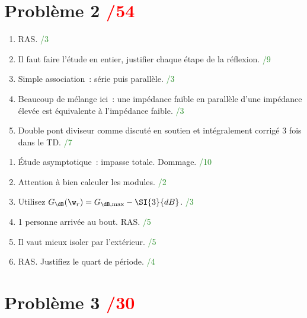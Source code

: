 \documentclass[a4paper, 10pt, final, garamond]{book}
\begin{document}
\section{Problème 2 \hfill \textcolor{red}{/54}}

\begin{minipage}{0.48\linewidth}
    \begin{enumerate}
        \item RAS. \hfill \textcolor{ForestGreen}{/3}
        \item Il faut faire l'étude en entier, justifier chaque étape de la
            réflexion. \hfill \textcolor{ForestGreen}{/9}
        \item Simple association~: série puis parallèle. \hfill
            \textcolor{ForestGreen}{/3}
        \item Beaucoup de mélange ici~: une impédance faible en parallèle d'une
            impédance élevée est équivalente à l'impédance faible. \hfill
            \textcolor{ForestGreen}{/3}
        \item Double pont diviseur comme discuté en soutien et intégralement corrigé
            3 fois dans le TD. \hfill \textcolor{ForestGreen}{/7}
    \end{enumerate}
\end{minipage}
\hfill
\begin{minipage}{0.48\linewidth}
    \begin{enumerate}
        \item Étude asymptotique~: impasse totale. Dommage. \hfill
            \textcolor{ForestGreen}{/10}
        \item Attention à bien calculer les modules. \hfill
            \textcolor{ForestGreen}{/2}
        \item Utilisez $G_{\dB}(\w_r) = G_{\dB, \max} - \SI{3}{dB}$. \hfill
            \textcolor{ForestGreen}{/3}
        \item 1 personne arrivée au bout. RAS. \hfill \textcolor{ForestGreen}{/5}
        \item Il vaut mieux isoler par l'extérieur. \hfill
            \textcolor{ForestGreen}{/5}
        \item RAS. Justifiez le quart de période. \hfill \textcolor{ForestGreen}{/4}
    \end{enumerate}
\end{minipage}

\section{Problème 3 \hfill \textcolor{red}{/30}}
\end{document}
